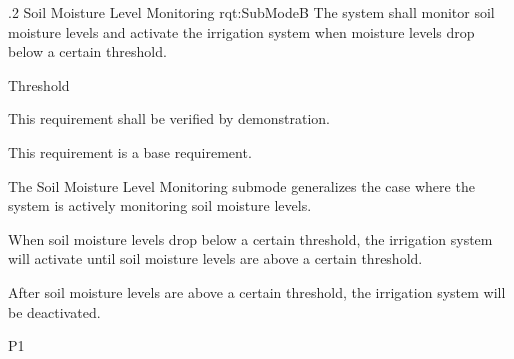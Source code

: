 \ONERQMTV
{\RqtNumberBase.2}
{Soil Moisture Level Monitoring}
{rqt:SubModeB}
{The system shall monitor soil moisture levels and activate the irrigation system when moisture levels drop below a certain threshold.}
{
	\item [All Phases] Threshold
}
{This requirement shall be verified by demonstration.}
{
	\item [N/A] This requirement is a base requirement.
}
{
	\item The Soil Moisture Level Monitoring submode generalizes the case where the system is actively monitoring soil moisture levels.
	\item When soil moisture levels drop below a certain threshold, the irrigation system will activate until soil moisture levels are above a certain threshold.
	\item After soil moisture levels are above a certain threshold, the irrigation system will be deactivated.
}
{P1}

